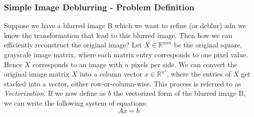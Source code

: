 \documentclass[unicode,11pt,a4paper,oneside,numbers=endperiod,openany]{scrartcl}
\begin{document}
\subsubsection{Simple Image Deblurring - Problem Definition}
Suppose we have a blurred image B which we want to refine (or deblur) adn we know the transformation that lead to this blurred image. Then how we can efficiently reconstruct the original image? Let $X \in \mathbb{R}^{nxn}$ be the original square, grayscale image matrix, where each matrix entry corresponds to one pixel value. Hence $X$ corresponds to an image with $n$ pixels per side. We can convert the original image matrix $X$ into a column vector $x \in \mathbb{R}^{n^2}$, where the entries of $X$ get stacked into a vector, either row-or-column-wise. This process is referred to as \textit{Vectorization}. If we now define as $b$ the vectorized form of the blurred image B, we can write the following system of equations: \[
                                                                                                                                                                                                                                                                                                                                                                                                                                                                                                                                                                                                                                                                                                                                                          Ax = b
                                                                                                                                                                                                                                                                                                                                                                                                                                                                                                                                                                                                                                                                                                                                                         \]
\end{document}
